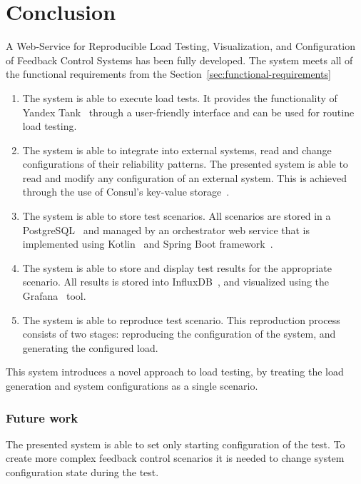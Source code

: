 \chapter{Conclusion}
\label{ch:conclustion}

A Web-Service for Reproducible Load Testing, Visualization, and Configuration of Feedback Control Systems has been fully developed. The system meets all of the functional requirements from the Section~\ref{sec:functional-requirements}
\begin{enumerate}
    \item The system is able to execute load tests. It provides the functionality of Yandex Tank~\cite{yandex_tank} through a user-friendly interface and can be used for routine load testing.
    \item The system is able to integrate into external systems, read and change configurations of their reliability patterns. The presented system is able to read and modify any configuration of an external system. This is achieved through the use of Consul's key-value storage~\cite{consul}.
    \item The system is able to store test scenarios. All scenarios are stored in a PostgreSQL~\cite{postgresql} and managed by an orchestrator web service that is implemented using Kotlin~\cite{kotlin} and Spring Boot framework~\cite{spring}.
    \item The system is able to store and display test results for the appropriate scenario. All results is stored into InfluxDB~\cite{influxdb}, and visualized using the Grafana~\cite{grafana} tool.
    \item The system is able to reproduce test scenario. This reproduction process consists of two stages: reproducing the configuration of the system, and generating the configured load.
\end{enumerate}
This system introduces a novel approach to load testing, by treating the load generation and system configurations as a single scenario.

\subsection{Future work}
The presented system is able to set only starting configuration of the test.
To create more complex feedback control scenarios it is needed to change system configuration state during the test.